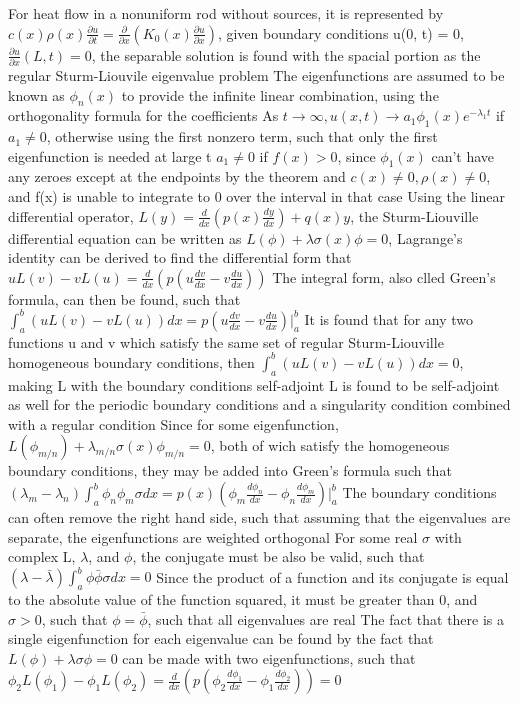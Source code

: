 \documentclass[11 pt, twoside]{article}
\newenvironment{outline*}
{
	\begin{outline}[enumerate]
	}
	{\end{outline}
}
\newcommand\pd[2]{\frac{\partial #1}{\partial #2}}
\begin{document}
\begin{outline*}
\1 For heat flow in a nonuniform rod without sources, it is represented by $c(x)\rho(x)\pd{u}{t} = \pd{}{x}(K_0(x)\pd{u}{x})$, given boundary conditions u(0, t) = 0, $\pd{u}{x}(L, t) = 0$, the separable solution is found with the spacial portion as the regular Sturm-Liouvile eigenvalue problem
	\2 The eigenfunctions are assumed to be known as $\phi_n(x)$ to provide the infinite linear combination, using the orthogonality formula for the coefficients
	\2 As $t \to \infty, u(x, t) \to a_1\phi_1(x)e^{-\lambda_1t}$ if $a_1 \neq 0$, otherwise using the first nonzero term, such that only the first eigenfunction is needed at large t
		\3 $a_1 \neq 0$ if $f(x) > 0$, since $\phi_1(x)$ can't have any zeroes except at the endpoints by the theorem and $c(x) \neq 0, \rho(x) \neq 0$, and f(x) is unable to integrate to 0 over the interval in that case
\1 Using the linear differential operator, $L(y) = \frac{d}{dx}(p(x)\frac{dy}{dx}) + q(x)y$, the Sturm-Liouville differential equation can be written as $L(\phi) + \lambda \sigma(x)\phi = 0$, Lagrange's identity can be derived to find the differential form that $uL(v) - vL(u) = \frac{d}{dx}(p(u\frac{dv}{dx} - v\frac{du}{dx}))$
	\2 The integral form, also clled Green's formula, can then be found, such that $\int^b_a (uL(v) - vL(u))dx = p(u\frac{dv}{dx} - v\frac{du}{dx})|^b_a$
	\2 It is found that for any two functions u and v which satisfy the same set of regular Sturm-Liouville homogeneous boundary conditions, then $\int^b_a (uL(v) - vL(u))dx = 0$, making L with the boundary conditions self-adjoint
		\3 L is found to be self-adjoint as well for the periodic boundary conditions and a singularity condition combined with a regular condition
\1 Since for some eigenfunction, $L(\phi_{m/n}) + \lambda_{m/n}\sigma(x)\phi_{m/n} = 0$, both of wich satisfy the homogeneous boundary conditions, they may be added into Green's formula such that $(\lambda_m - \lambda_n) \int^b_a \phi_n\phi_m\sigma dx = p(x)(\phi_m \frac{d\phi_n}{dx} - \phi_n \frac{d\phi_m}{dx})|^b_a$
	\2 The boundary conditions can often remove the right hand side, such that assuming that the eigenvalues are separate, the eigenfunctions are weighted orthogonal
	\2 For some real $\sigma$ with complex L, $\lambda$, and $\phi$, the conjugate must be also be valid, such that $(\lambda - \bar{\lambda}) \int^b_a \phi \bar{\phi}\sigma dx = 0$
		\3 Since the product of a function and its conjugate is equal to the absolute value of the function squared, it must be greater than 0, and $\sigma > 0$, such that $\phi = \bar{\phi}$, such that all eigenvalues are real
	\2 The fact that there is a single eigenfunction for each eigenvalue can be found by the fact that $L(\phi) + \lambda\sigma\phi = 0$ can be made with two eigenfunctions, such that $\phi_2 L(\phi_1) - \phi_1 L(\phi_2) = \frac{d}{dx}(p(\phi_2\frac{d\phi_1}{dx} - \phi_1\frac{d\phi_2}{dx})) = 0$

\end{outline*}
\end{document}
